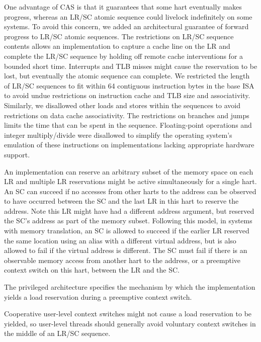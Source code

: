 \begin{commentary}
One advantage of CAS is that it guarantees that some hart eventually
makes progress, whereas an LR/SC atomic sequence could livelock
indefinitely on some systems.  To avoid this concern, we added an
architectural guarantee of forward progress to LR/SC atomic sequences.
The restrictions on LR/SC sequence contents allows an implementation
to capture a cache line on the LR and complete the LR/SC sequence by
holding off remote cache interventions for a bounded short
time. Interrupts and TLB misses might cause the reservation to be
lost, but eventually the atomic sequence can complete.  We restricted
the length of LR/SC sequences to fit within 64 contiguous instruction
bytes in the base ISA to avoid undue restrictions on instruction cache
and TLB size and associativity.  Similarly, we disallowed other loads
and stores within the sequences to avoid restrictions on data cache
associativity.  The restrictions on branches and jumps limits the time
that can be spent in the sequence.  Floating-point operations and
integer multiply/divide were disallowed to simplify the operating
system's emulation of these instructions on implementations lacking
appropriate hardware support.
\end{commentary}

An implementation can reserve an arbitrary subset of the memory space
on each LR and multiple LR reservations might be active simultaneously
for a single hart.  An SC can succeed if no accesses from other harts
to the address can be observed to have occurred between the SC and
the last LR in this hart to reserve the address.  Note this LR might
have had a different address argument, but reserved the SC's address
as part of the memory subset.  Following this model, in systems with
memory translation, an SC is allowed to succeed if the earlier LR
reserved the same location using an alias with a different virtual
address, but is also allowed to fail if the virtual address is
different.  The SC must fail if there is an observable memory access
from another hart to the address, or a preemptive context switch on
this hart, between the LR and the SC.

\begin{commentary}
The privileged architecture specifies the mechanism by which the
implementation yields a load reservation during a preemptive context switch.

Cooperative user-level context switches might not cause a load reservation
to be yielded, so user-level threads should generally avoid voluntary
context switches in the middle of an LR/SC sequence.
\end{commentary}

